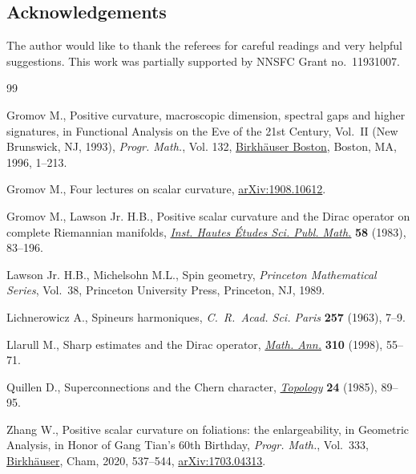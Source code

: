 \documentclass[pdftex]{sigma}
\numberwithin{equation}{section}
\theoremstyle{definition}
\begin{document}
\subsection*{Acknowledgements}

The author would like to thank the referees for careful readings and very helpful suggestions. This work was partially supported by NNSFC Grant no.~11931007.

\begin{thebibliography}{99}
\footnotesize\itemsep=0pt

Gromov M., Positive curvature, macroscopic dimension, spectral gaps and higher
 signatures, in Functional Analysis on the Eve of the 21st Century,
 {V}ol.~{II} ({N}ew {B}runswick, {NJ}, 1993), \textit{Progr. Math.}, Vol. 132,
 \href{https://doi.org/10.1007/s10107-010-0354-x}{Birkh\"{a}user Boston}, Boston, MA, 1996, 1--213.

Gromov M., Four lectures on scalar curvature, \href{https://arxiv.org/abs/1908.10612}{arXiv:1908.10612}.

Gromov M., Lawson Jr. H.B., Positive scalar curvature and the {D}irac operator
 on complete {R}iemannian manifolds, \href{https://doi.org/10.1007/BF02953774}{\textit{Inst. Hautes \'Etudes Sci. Publ. Math.}} \textbf{58} (1983), 83--196.

Lawson Jr. H.B., Michelsohn M.L., Spin geometry, \textit{Princeton Mathematical
 Series}, Vol.~38, Princeton University Press, Princeton, NJ, 1989.

Lichnerowicz A., Spineurs harmoniques, \textit{C.~R.~Acad. Sci. Paris} \textbf{257} (1963), 7--9.

Llarull M., Sharp estimates and the {D}irac operator, \href{https://doi.org/10.1007/s002080050136}{\textit{Math. Ann.}} \textbf{310} (1998), 55--71.

Quillen D., Superconnections and the {C}hern character, \href{https://doi.org/10.1016/0040-9383(85)90047-3}{\textit{Topology}} \textbf{24} (1985), 89--95.

Zhang W., Positive scalar curvature on foliations: the enlargeability, in
 Geometric Analysis, in Honor of Gang Tian's 60th Birthday, \textit{Progr.
 Math.}, Vol.~333, \href{https://doi.org/10.1007/978-3-030-34953-0_22}{Birkh\"auser}, Cham, 2020, 537--544, \href{https://arxiv.org/abs/1703.04313}{arXiv:1703.04313}.

\end{thebibliography}\LastPageEnding
\end{document}
